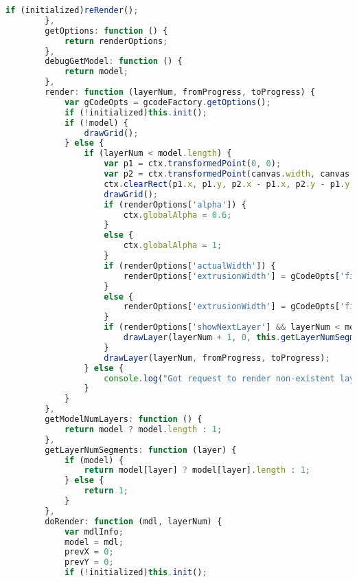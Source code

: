 \begin{lstlisting}[language=JavaScript, label={lst:renderFactory}, caption=When render frames are requested this file compiles the lines of gcode from the worker and sets up the rest of the canvas frames.]
            if (initialized)reRender();
        },
        getOptions: function () {
            return renderOptions;
        },
        debugGetModel: function () {
            return model;
        },
        render: function (layerNum, fromProgress, toProgress) {
            var gCodeOpts = gcodeFactory.getOptions();
            if (!initialized)this.init();
            if (!model) {
                drawGrid();
            } else {
                if (layerNum < model.length) {
                    var p1 = ctx.transformedPoint(0, 0);
                    var p2 = ctx.transformedPoint(canvas.width, canvas.height);
                    ctx.clearRect(p1.x, p1.y, p2.x - p1.x, p2.y - p1.y);
                    drawGrid();
                    if (renderOptions['alpha']) {
                        ctx.globalAlpha = 0.6;
                    }
                    else {
                        ctx.globalAlpha = 1;
                    }
                    if (renderOptions['actualWidth']) {
                        renderOptions['extrusionWidth'] = gCodeOpts['filamentDia'] * gCodeOpts['wh'] / zoomFactor;
                    }
                    else {
                        renderOptions['extrusionWidth'] = gCodeOpts['filamentDia'] * gCodeOpts['wh'] / zoomFactor / 2;
                    }
                    if (renderOptions['showNextLayer'] && layerNum < model.length - 1) {
                        drawLayer(layerNum + 1, 0, this.getLayerNumSegments(layerNum + 1), true);
                    }
                    drawLayer(layerNum, fromProgress, toProgress);
                } else {
                    console.log("Got request to render non-existent layer!!");
                }
            }
        },
        getModelNumLayers: function () {
            return model ? model.length : 1;
        },
        getLayerNumSegments: function (layer) {
            if (model) {
                return model[layer] ? model[layer].length : 1;
            } else {
                return 1;
            }
        },
        doRender: function (mdl, layerNum) {
            var mdlInfo;
            model = mdl;
            prevX = 0;
            prevY = 0;
            if (!initialized)this.init();


\end{lstlisting}
